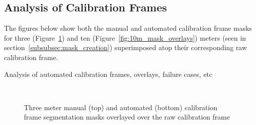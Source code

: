 \subsection{Analysis of Calibration Frames}

The figures below show both the manual and automated calibration frame masks for
three (Figure~\ref{fig:3m_mask_overlays}) and ten (Figure~\ref{fig:10m_mask_overlays})
meters (seen in section~\ref{subsubsec:mask_creation}) superimposed atop their
corresponding raw calibration frame.

Analysis of automated calibration frames, overlays, failure cases, etc

\begin{figure}[htbp]
    \centering
    \\[1mm]
    \caption{Three meter manual (top) and automated (bottom) calibration frame segmentation masks overlayed over
    the raw calibration frame}
    \label{fig:3m_mask_overlays}
\end{figure}

